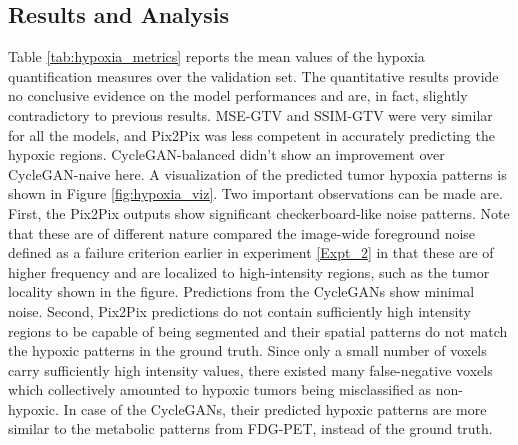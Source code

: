 \subsection{Results and Analysis}
Table \ref{tab:hypoxia_metrics} reports the mean values of the hypoxia quantification measures over the validation set. The quantitative results provide no conclusive evidence on the model performances and are, in fact, slightly contradictory to previous results. MSE-GTV and SSIM-GTV were very similar for all the models, and Pix2Pix was less competent in accurately predicting the hypoxic regions. CycleGAN-balanced didn't show an improvement over CycleGAN-naive here. A visualization of the predicted tumor hypoxia patterns is shown in Figure \ref{fig:hypoxia_viz}. Two important observations can be made are. First, the Pix2Pix outputs show significant checkerboard-like noise patterns. Note that these are of different nature compared the image-wide foreground noise defined as a failure criterion earlier in experiment \ref{Expt_2} in that these are of higher frequency and are localized to high-intensity regions, such as the tumor locality shown in the figure. Predictions from the CycleGANs show minimal noise. Second, Pix2Pix predictions do not contain sufficiently high intensity regions to be capable of being segmented and their spatial patterns do not match the hypoxic patterns in the ground truth. Since only a small number of voxels carry sufficiently high intensity values, there existed many false-negative voxels which collectively amounted to hypoxic tumors being misclassified as non-hypoxic. In case of the CycleGANs, their predicted hypoxic patterns are more similar to the metabolic patterns from FDG-PET, instead of the ground truth.

\begin{table}[h!]
    \footnotesize
    \centering
    \caption{Results of tumor hypoxia quantification. Best and second-to-best values are highlighted with bold and italics font, respectively. For tumor classification, the accuracy is given in percentage values and fraction of patients with correctly classified tumors.}
    \label{tab:hypoxia_metrics}
\end{table}

